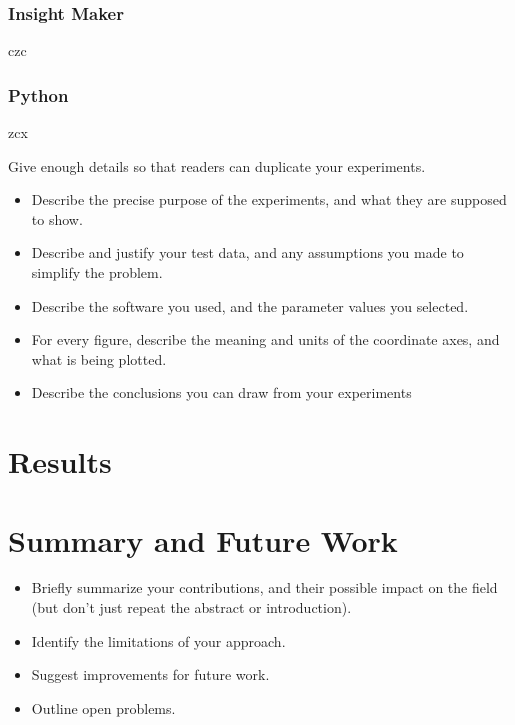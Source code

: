 \documentclass[10pt]{article}
\begin{document}
\subsubsection{Insight Maker}
czc

\subsubsection{Python}
zcx


Give enough details so that readers can duplicate your experiments.

\begin{itemize}
\item Describe the precise purpose of the experiments, and what they 
are supposed to show.

\item Describe and justify your test data, and any assumptions you made to 
simplify the problem.

\item Describe the software you used, and the 
parameter values you selected.

\item 
For every figure, describe the meaning and units of the coordinate axes, 
and what is being plotted.

\item Describe the conclusions you can draw from your experiments
\end{itemize}
%
%
%
%
%
%
%
%
%
\section{Results}\label{sec:Results}
%
%
%
%
%
%
%
%
%


\section{Summary and Future Work}\label{sec:Summary}
\begin{itemize}
\item Briefly summarize your contributions, and their possible
impact on the field (but don't just repeat the abstract or introduction).
\item Identify the limitations of your approach.
\item Suggest improvements for future work.
\item Outline open problems.
\end{itemize}


\end{document}
